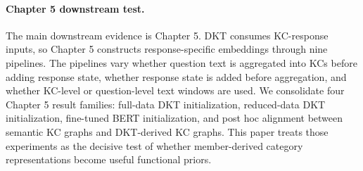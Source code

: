 \paragraph{Chapter 5 downstream test.}
The main downstream evidence is Chapter 5. DKT consumes KC-response inputs, so Chapter 5 constructs response-specific embeddings through nine pipelines. The pipelines vary whether question text is aggregated into KCs before adding response state, whether response state is added before aggregation, and whether KC-level or question-level text windows are used. We consolidate four Chapter 5 result families: full-data DKT initialization, reduced-data DKT initialization, fine-tuned BERT initialization, and post hoc alignment between semantic KC graphs and DKT-derived KC graphs. This paper treats those experiments as the decisive test of whether member-derived category representations become useful functional priors.
